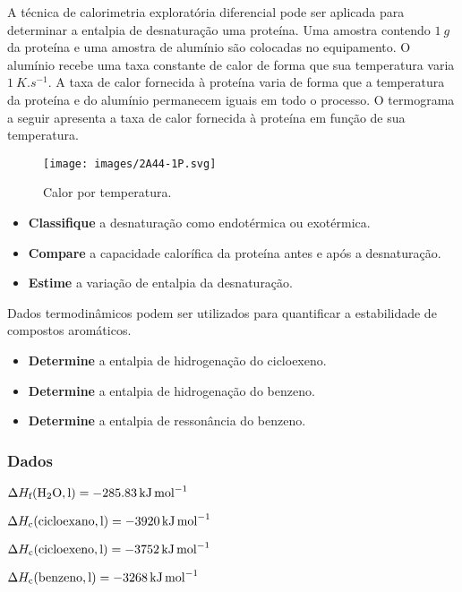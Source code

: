 \documentclass[braun, twocolumn]{braun}
\begin{document}
\begin{problem}
[2A44]A técnica de calorimetria exploratória diferencial pode ser aplicada
para determinar a entalpia de desnaturação uma proteína. Uma amostra
contendo \(\qty{1}{g}\) da proteína e uma amostra de alumínio são
colocadas no equipamento. O alumínio recebe uma taxa constante de calor
de forma que sua temperatura varia \(\qty{1}{K.s^{-1}}\). A taxa de calor
fornecida à proteína varia de forma que a temperatura da proteína e do
alumínio permanecem iguais em todo o processo. O termograma a seguir
apresenta a taxa de calor fornecida à proteína em função de sua
temperatura.

\begin{figure}
\centering
\texttt{[image: images/2A44-1P.svg]}
\caption{Calor por temperatura.}
\end{figure}

\begin{itemize}

\item
  \textbf{Classifique} a desnaturação como endotérmica ou exotérmica.
\item
  \textbf{Compare} a capacidade calorífica da proteína antes e após a
  desnaturação.
\item
  \textbf{Estime} a variação de entalpia da desnaturação.
\end{itemize}

\end{problem}



\begin{problem}
[2A45]Dados termodinâmicos podem ser utilizados para quantificar a
estabilidade de compostos aromáticos.

\begin{itemize}

\item
  \textbf{Determine} a entalpia de hidrogenação do cicloexeno.
\item
  \textbf{Determine} a entalpia de hidrogenação do benzeno.
\item
  \textbf{Determine} a entalpia de ressonância do benzeno.
\end{itemize}
\subsubsection*{Dados}


\begin{datalist}

\item $\Delta H_\text{f}(\ce{H2O, {l}}) = \qty{-285,83}{kJ.mol^{-1}}$
\item $\Delta H_\text{c}(\ce{cicloexano, {l}}) = \qty{-3920}{kJ.mol^{-1}}$
\item $\Delta H_\text{c}(\ce{cicloexeno, {l}}) = \qty{-3752}{kJ.mol^{-1}}$
\item $\Delta H_\text{c}(\ce{benzeno, {l}}) = \qty{-3268}{kJ.mol^{-1}}$
\end{datalist}

\end{problem}
\end{document}
